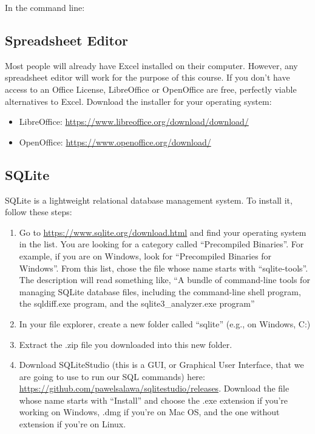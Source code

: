 \documentclass[
]{book}
\newenvironment{Shaded}{\begin{snugshade}}{\end{snugshade}}
\newcommand{\ExtensionTok}[1]{#1}
\newcommand{\NormalTok}[1]{#1}
\providecommand{\tightlist}{%
  \setlength{\itemsep}{0pt}\setlength{\parskip}{0pt}}
\begin{document}
In the command line:

\begin{Shaded}
\end{Shaded}

\hypertarget{spreadsheet-editor}{%
\subsection{Spreadsheet Editor}\label{spreadsheet-editor}}

Most people will already have Excel installed on their computer. However, any
spreadsheet editor will work for the purpose of this course. If you don't have
access to an Office License, LibreOffice or OpenOffice are free, perfectly viable alternatives to Excel. Download the installer for your operating system:

\begin{itemize}
\tightlist
\item
  LibreOffice: \url{https://www.libreoffice.org/download/download/}
\item
  OpenOffice: \url{https://www.openoffice.org/download/}
\end{itemize}

\hypertarget{sqlite}{%
\subsection{SQLite}\label{sqlite}}

SQLite is a lightweight relational database management system. To install it,
follow these steps:

\begin{enumerate}
\def\labelenumi{\arabic{enumi}.}
\item
  Go to \url{https://www.sqlite.org/download.html} and find your operating system in
  the list. You are looking for a category called ``Precompiled Binaries''. For
  example, if you are on Windows, look for ``Precompiled Binaries for Windows''.
  From this list, chose the file whose name starts with ``sqlite-tools''. The
  description will read something like, ``A bundle of command-line tools for
  managing SQLite database files, including the command-line shell program, the
  sqldiff.exe program, and the sqlite3\_analyzer.exe program''
\item
  In your file explorer, create a new folder called ``sqlite'' (e.g., on Windows,
  C:\sqlite)
\item
  Extract the .zip file you downloaded into this new folder.
\item
  Download SQLiteStudio (this is a GUI, or Graphical User Interface, that we
  are going to use to run our SQL commands) here: \url{https://github.com/pawelsalawa/sqlitestudio/releases}. Download the file whose
  name starts with ``Install'' and choose the .exe extension if you're working on
  Windows, .dmg if you're on Mac OS, and the one without extension if you're on
  Linux.
\end{enumerate}
\end{document}

